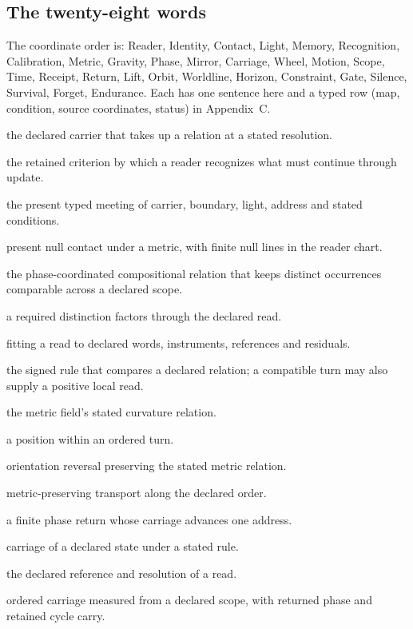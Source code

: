 \documentclass[11pt,a4paper]{article}
\theoremstyle{plain}
\theoremstyle{definition}
\theoremstyle{remark}
\begin{document}
\subsection{The twenty-eight words}\label{sec:words}
The coordinate order is: Reader, Identity, Contact, Light, Memory, Recognition, Calibration, Metric, Gravity, Phase, Mirror, Carriage, Wheel, Motion, Scope, Time, Receipt, Return, Lift, Orbit, Worldline, Horizon, Constraint, Gate, Silence, Survival, Forget, Endurance. Each has one sentence here and a typed row (map, condition, source coordinates, status) in Appendix~C.
\begin{description}[leftmargin=0pt,labelindent=0pt,itemsep=1pt,font=\normalfont\bfseries]
\item[Reader] the declared carrier that takes up a relation at a stated resolution.
\item[Identity] the retained criterion by which a reader recognizes what must continue through update.
\item[Contact] the present typed meeting of carrier, boundary, light, address and stated conditions.
\item[Light] present null contact under a metric, with finite null lines in the reader chart.
\item[Memory] the phase-coordinated compositional relation that keeps distinct occurrences comparable across a declared scope.
\item[Recognition] a required distinction factors through the declared read.
\item[Calibration] fitting a read to declared words, instruments, references and residuals.
\item[Metric] the signed rule that compares a declared relation; a compatible turn may also supply a positive local read.
\item[Gravity] the metric field's stated curvature relation.
\item[Phase] a position within an ordered turn.
\item[Mirror] orientation reversal preserving the stated metric relation.
\item[Carriage] metric-preserving transport along the declared order.
\item[Wheel] a finite phase return whose carriage advances one address.
\item[Motion] carriage of a declared state under a stated rule.
\item[Scope] the declared reference and resolution of a read.
\item[Time] ordered carriage measured from a declared scope, with returned phase and retained cycle carry.

\end{description}
\end{document}
